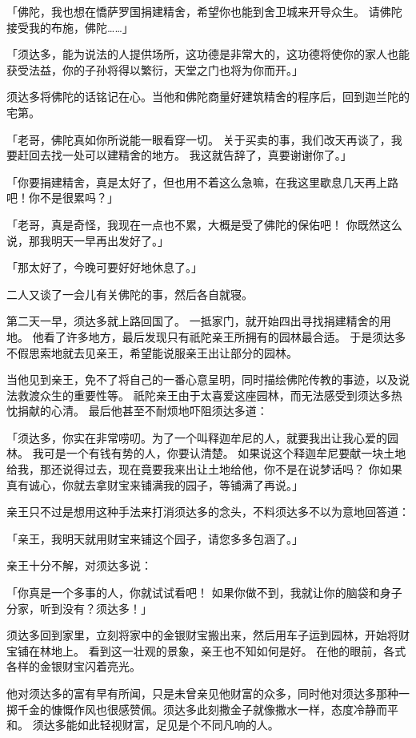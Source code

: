 \documentclass[twoside,openany]{book}
\begin{document}
「佛陀，我也想在憍萨罗国捐建精舍，希望你也能到舍卫城来开导众生。
请佛陀接受我的布施，佛陀……」

「须达多，能为说法的人提供场所，这功德是非常大的，这功德将使你的家人也能获受法益，你的子孙将得以繁衍，天堂之门也将为你而开。」

须达多将佛陀的话铭记在心。当他和佛陀商量好建筑精舍的程序后，回到迦兰陀的宅第。

「老哥，佛陀真如你所说能一眼看穿一切。
关于买卖的事，我们改天再谈了，我要赶回去找一处可以建精舍的地方。
我这就告辞了，真要谢谢你了。」

「你要捐建精舍，真是太好了，但也用不着这么急嘛，在我这里歇息几天再上路吧！你不是很累吗？」

「老哥，真是奇怪，我现在一点也不累，大概是受了佛陀的保佑吧！
你既然这么说，那我明天一早再出发好了。」

「那太好了，今晚可要好好地休息了。」

二人又谈了一会儿有关佛陀的事，然后各自就寝。

第二天一早，须达多就上路回国了。
一抵家门，就开始四出寻找捐建精舍的用地。
他看了许多地方，最后发现只有祇陀亲王所拥有的园林最合适。
于是须达多不假思索地就去见亲王，希望能说服亲王出让部分的园林。

当他见到亲王，免不了将自己的一番心意呈明，同时描绘佛陀传教的事迹，以及说法救渡众生的重要性等。
祇陀亲王由于太喜爱这座园林，而无法感受到须达多热忱捐献的心清。
最后他甚至不耐烦地吓阻须达多道：

「须达多，你实在非常唠叨。为了一个叫释迦牟尼的人，就要我出让我心爱的园林。
我可是一个有钱有势的人，你要认清楚。
如果说这个释迦牟尼要献一块土地给我，那还说得过去，现在竟要我来出让土地给他，你不是在说梦话吗？
你如果真有诚心，你就去拿财宝来铺满我的园子，等铺满了再说。」

亲王只不过是想用这种手法来打消须达多的念头，不料须达多不以为意地回答道：

「亲王，我明天就用财宝来铺这个园子，请您多多包涵了。」

亲王十分不解，对须达多说：

「你真是一个多事的人，你就试试看吧！
如果你做不到，我就让你的脑袋和身子分家，听到没有？须达多！」

须达多回到家里，立刻将家中的金银财宝搬出来，然后用车子运到园林，开始将财宝铺在林地上。
看到这一壮观的景象，亲王也不知如何是好。
在他的眼前，各式各样的金银财宝闪着亮光。

他对须达多的富有早有所闻，只是未曾亲见他财富的众多，同时他对须达多那种一掷千金的慷慨作风也很感赞佩。须达多此刻撒金子就像撒水一样，态度冷静而平和。
须达多能如此轻视财富，足见是个不同凡响的人。
\end{document}
